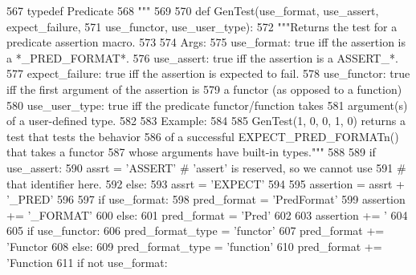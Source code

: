 \begin{DoxyCode}
{{{{{{{{{{{{{{{{{{{{{{{{{{{{{{{{{{{{{{{{{{{{{{{{567 \textcolor{stringliteral}{typedef Predicate%
568 \textcolor{stringliteral}{"""} %
569 
570   \textcolor{keyword}{def }GenTest(use\_format, use\_assert, expect\_failure,
571               use\_functor, use\_user\_type):
572     \textcolor{stringliteral}{"""Returns the test for a predicate assertion macro.}
573 \textcolor{stringliteral}{}
574 \textcolor{stringliteral}{    Args:}
575 \textcolor{stringliteral}{      use\_format:     true iff the assertion is a *\_PRED\_FORMAT*.}
576 \textcolor{stringliteral}{      use\_assert:     true iff the assertion is a ASSERT\_*.}
577 \textcolor{stringliteral}{      expect\_failure: true iff the assertion is expected to fail.}
578 \textcolor{stringliteral}{      use\_functor:    true iff the first argument of the assertion is}
579 \textcolor{stringliteral}{                      a functor (as opposed to a function)}
580 \textcolor{stringliteral}{      use\_user\_type:  true iff the predicate functor/function takes}
581 \textcolor{stringliteral}{                      argument(s) of a user-defined type.}
582 \textcolor{stringliteral}{}
583 \textcolor{stringliteral}{    Example:}
584 \textcolor{stringliteral}{}
585 \textcolor{stringliteral}{      GenTest(1, 0, 0, 1, 0) returns a test that tests the behavior}
586 \textcolor{stringliteral}{      of a successful EXPECT\_PRED\_FORMATn() that takes a functor}
587 \textcolor{stringliteral}{      whose arguments have built-in types."""}
588 
589     \textcolor{keywordflow}{if} use\_assert:
590       assrt = \textcolor{stringliteral}{'ASSERT'}  \textcolor{comment}{# 'assert' is reserved, so we cannot use}
591                         \textcolor{comment}{# that identifier here.}
592     \textcolor{keywordflow}{else}:
593       assrt = \textcolor{stringliteral}{'EXPECT'}
594 
595     assertion = assrt + \textcolor{stringliteral}{'\_PRED'}
596 
597     \textcolor{keywordflow}{if} use\_format:
598       pred\_format = \textcolor{stringliteral}{'PredFormat'}
599       assertion += \textcolor{stringliteral}{'\_FORMAT'}
600     \textcolor{keywordflow}{else}:
601       pred\_format = \textcolor{stringliteral}{'Pred'}
602 
603     assertion += \textcolor{stringliteral}{'%
604 
605     \textcolor{keywordflow}{if} use\_functor:
606       pred\_format\_type = \textcolor{stringliteral}{'functor'}
607       pred\_format += \textcolor{stringliteral}{'Functor%
608     \textcolor{keywordflow}{else}:
609       pred\_format\_type = \textcolor{stringliteral}{'function'}
610       pred\_format += \textcolor{stringliteral}{'Function%
611       \textcolor{keywordflow}{if} \textcolor{keywordflow}{not} use\_format:
}}}}}}}}}}}}}}}}}}}}}}}}}}}}}}}}}}}}}}}}}}}}}}}}}}}}
\end{DoxyCode}
